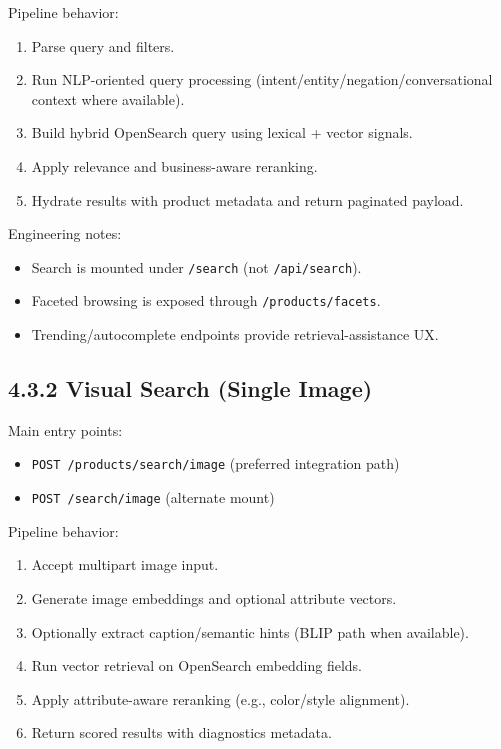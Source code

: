 \documentclass[12pt,a4paper]{report}
\begin{document}
Pipeline behavior:

\begin{enumerate}
\item Parse query and filters.
\item Run NLP-oriented query processing (intent/entity/negation/conversational context where available).
\item Build hybrid OpenSearch query using lexical + vector signals.
\item Apply relevance and business-aware reranking.
\item Hydrate results with product metadata and return paginated payload.
\end{enumerate}

Engineering notes:

\begin{itemize}
\item Search is mounted under \texttt{/search} (not \texttt{/api/search}).
\item Faceted browsing is exposed through \texttt{/products/facets}.
\item Trending/autocomplete endpoints provide retrieval-assistance UX.
\end{itemize}

\subsection{4.3.2 Visual Search (Single Image)}
Main entry points:

\begin{itemize}
\item \texttt{POST /products/search/image} (preferred integration path)
\item \texttt{POST /search/image} (alternate mount)
\end{itemize}

Pipeline behavior:

\begin{enumerate}
\item Accept multipart image input.
\item Generate image embeddings and optional attribute vectors.
\item Optionally extract caption/semantic hints (BLIP path when available).
\item Run vector retrieval on OpenSearch embedding fields.
\item Apply attribute-aware reranking (e.g., color/style alignment).
\item Return scored results with diagnostics metadata.
\end{enumerate}
\end{document}
